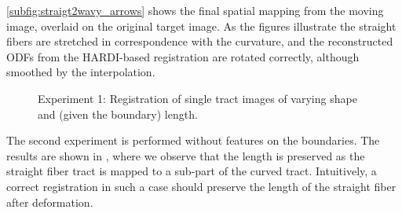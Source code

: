 \documentclass[twocolumn]{svjour3}
\begin{document}
\ref{subfig:straigt2wavy_arrows} shows the final spatial mapping from the moving image,
overlaid on the original target
image. 
As the figures illustrate the straight fibers are stretched in correspondence with the
curvature, and the reconstructed ODFs from the HARDI-based registration are rotated
correctly, although smoothed by the
interpolation.
\begin{figure}[!ht]
  \centering \vspace*{-0.4cm} 
  \hspace*{.5cm}
  \caption{Experiment 1: Registration of single tract images of varying shape and (given
    the boundary) length.}
  \label{fig:straight2wavy_l_results}
\end{figure}
The second experiment is performed without features on the boundaries. The results are
shown in , where we observe that the length is
preserved as the straight fiber tract is mapped to a sub-part of the curved
tract. Intuitively, a correct registration in such a case should preserve the length of
the straight fiber after deformation.
\end{document}
